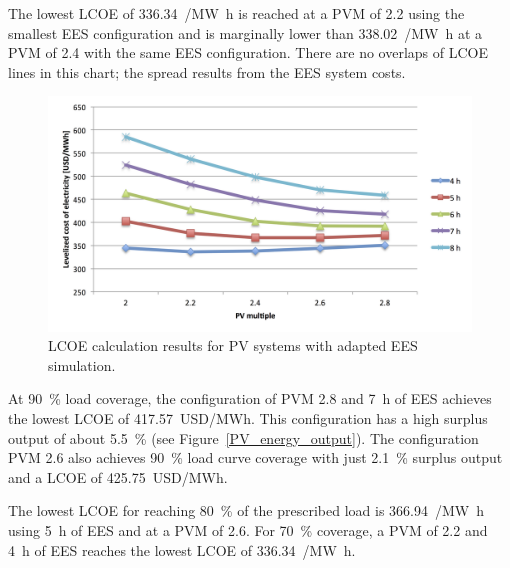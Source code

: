 The lowest LCOE of \SI{336.34}{\usd/\mega\watt\hour} is reached at a PVM of \num{2.2} using the smallest EES configuration and is marginally lower than \SI{338.02}{\usd/\mega\watt\hour} at a PVM of \num{2.4} with the same EES configuration. There are no overlaps of LCOE lines in this chart; the spread results from the EES system costs.

\begin{figure}[htbp]  
\centering
\includegraphics[width=1\linewidth]{FIG/PV_LCOE}
\caption[LCOE calculation results for PV systems with adapted EES simulation.]{LCOE calculation results for PV systems with adapted EES simulation.}\label{PV_LCOE}
\end{figure}


At \SI{90}{\percent} load coverage, the configuration of PVM \num{2.8} and \SI{7}{h} of EES achieves the lowest LCOE of \SI{417.57}{USD/MWh}. This configuration has a high surplus output of about \SI{5.5}{\percent} (see Figure~\ref{PV_energy_output}). The configuration PVM \num{2.6} also achieves \SI{90}{\percent} load curve coverage with just \SI{2.1}{\percent} surplus output and a LCOE of \SI{425.75}{USD/MWh}.


The lowest LCOE for reaching \SI{80}{\percent} of the prescribed load is \SI{366.94}{\usd/\mega\watt\hour} using \SI{5}{h} of EES and at a PVM of \num{2.6}. For \SI{70}{\percent} coverage, a PVM of \num{2.2} and \SI{4}{h} of EES reaches the lowest LCOE of \SI{336.34}{\usd/\mega\watt\hour}.